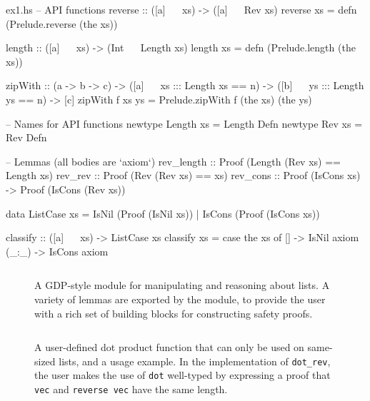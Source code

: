 \documentclass[format=sigplan, review=false, screen=true, 10pt]{acmart}
\begin{document}
\begin{filecontents*}{ex1.hs}
-- API functions
reverse :: ([a] ~~ xs) -> ([a] ~~ Rev xs)
reverse xs = defn (Prelude.reverse (the xs))

length :: ([a] ~~ xs) -> (Int ~~ Length xs)
length xs = defn (Prelude.length (the xs))

zipWith :: (a -> b -> c)
         -> ([a] ~~ xs ::: Length xs == n)
         -> ([b] ~~ ys ::: Length ys == n)
         -> [c]
zipWith f xs ys = Prelude.zipWith f (the xs) (the ys)

-- Names for API functions
newtype Length xs = Length  Defn
newtype Rev    xs = Rev     Defn

-- Lemmas (all bodies are `axiom`)
rev_length :: Proof (Length (Rev xs) == Length xs)
rev_rev    :: Proof (Rev (Rev xs) == xs)
rev_cons   :: Proof (IsCons xs) -> Proof (IsCons (Rev xs))

data ListCase xs = IsNil  (Proof (IsNil  xs))
                 | IsCons (Proof (IsCons xs)) 

classify :: ([a] ~~ xs) -> ListCase xs
classify xs = case the xs of
  []    -> IsNil  axiom
  (_:_) -> IsCons axiom
\end{filecontents*}


\begin{figure}
    \inputminted{haskell}{ex1.hs}
    \caption{A GDP-style module for manipulating and reasoning about lists.
      A variety of lemmas are exported by the module, to provide the
      user with a rich set of building blocks for constructing safety proofs.
       \label{lemma-demo}}
\end{figure}
\begin{figure}
    \inputminted{haskell}{ex2.hs}
    \caption{A user-defined dot product function that can only be used on same-sized lists,
      and a usage example. In the implementation of \texttt{dot\_rev}, the user makes the use
      of \texttt{dot} well-typed by expressing a proof that
      \texttt{vec} and \texttt{reverse vec} have the same length.\label{dot-product}}
\end{figure}
\end{document}
